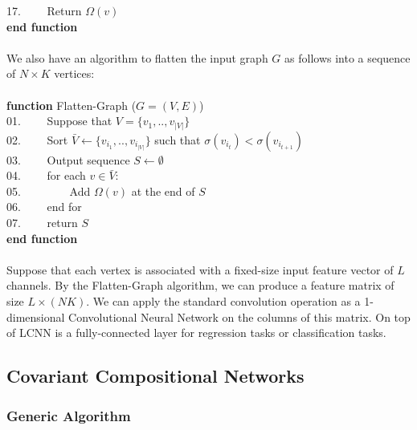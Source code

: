 \documentclass[a4paper]{article}
\begin{document}
17. \ \ \ \ Return $\Omega(v)$ \\
\textbf{end function} \\ \\
We also have an algorithm to flatten the input graph $G$ as follows into a sequence of $N \times K$ vertices: \\ \\
\textbf{function} Flatten-Graph ($G = (V, E)$) \\
01. \ \ \ \ Suppose that $V = \{v_1, .., v_{|V|}\}$ \\
02. \ \ \ \ Sort $\bar{V} \leftarrow \{v_{i_1}, .., v_{i_{|V|}}\}$ such that $\sigma(v_{i_t}) < \sigma(v_{i_{t + 1}})$ \\
03. \ \ \ \ Output sequence $S \leftarrow \emptyset$ \\
04. \ \ \ \ for each $v \in \bar{V}$: \\
05. \ \ \ \ \ \ \ \ Add $\Omega(v)$ at the end of $S$ \\
06. \ \ \ \ end for \\
07. \ \ \ \ return $S$ \\
\textbf{end function} \\ \\
Suppose that each vertex is associated with a fixed-size input feature vector of $L$ channels. By the Flatten-Graph algorithm, we can produce a feature matrix of size $L \times (NK)$. We can apply the standard convolution operation as a 1-dimensional Convolutional Neural Network on the columns of this matrix. On top of LCNN is a fully-connected layer for regression tasks or classification tasks.  

\subsection{Covariant Compositional Networks}

\subsubsection{Generic Algorithm}
\end{document}
